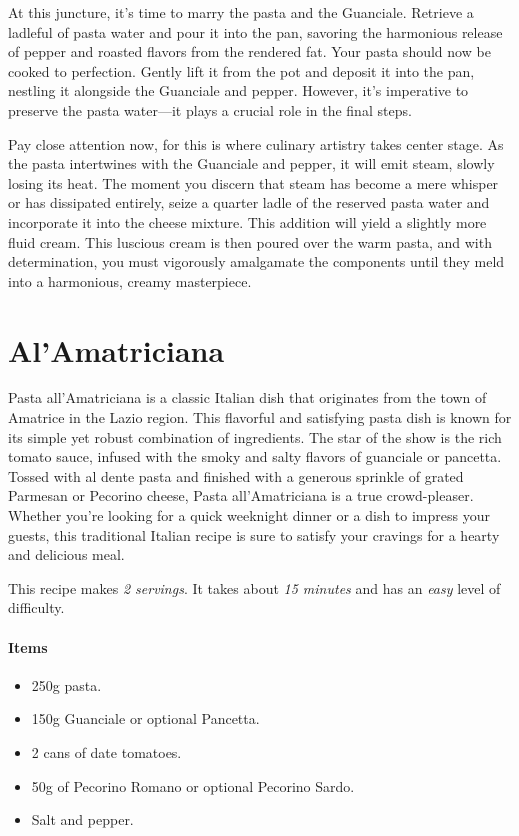At this juncture, it's time to marry the pasta and the Guanciale. Retrieve a ladleful of pasta water and pour it into the pan, savoring the harmonious release of pepper and roasted flavors from the rendered fat. Your pasta should now be cooked to perfection. Gently lift it from the pot and deposit it into the pan, nestling it alongside the Guanciale and pepper. However, it's imperative to preserve the pasta water—it plays a crucial role in the final steps.

Pay close attention now, for this is where culinary artistry takes center stage. As the pasta intertwines with the Guanciale and pepper, it will emit steam, slowly losing its heat. The moment you discern that steam has become a mere whisper or has dissipated entirely, seize a quarter ladle of the reserved pasta water and incorporate it into the cheese mixture. This addition will yield a slightly more fluid cream. This luscious cream is then poured over the warm pasta, and with determination, you must vigorously amalgamate the components until they meld into a harmonious, creamy masterpiece.

\section{Al'Amatriciana}
\label{alamatriciana}
Pasta all'Amatriciana is a classic Italian dish that originates from the town of Amatrice in the Lazio region. This flavorful and satisfying pasta dish is known for its simple yet robust combination of ingredients. The star of the show is the rich tomato sauce, infused with the smoky and salty flavors of guanciale or pancetta. Tossed with al dente pasta and finished with a generous sprinkle of grated Parmesan or Pecorino cheese, Pasta all'Amatriciana is a true crowd-pleaser. Whether you're looking for a quick weeknight dinner or a dish to impress your guests, this traditional Italian recipe is sure to satisfy your cravings for a hearty and delicious meal.

This recipe makes \emph{2 servings}. It takes about \emph{15 minutes} and has an \emph{easy} level of difficulty. 

\paragraph{Items}
\begin{itemize}[noitemsep]
    \item[\ding{182}] 250g pasta.
    \item[\ding{183}] 150g Guanciale or optional Pancetta.
    \item[\ding{184}] 2 cans of date tomatoes.
    \item[\ding{185}] 50g of Pecorino Romano or optional Pecorino Sardo.
    \item[\ding{186}] Salt and pepper.
\end{itemize}

